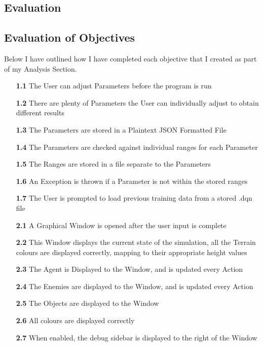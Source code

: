 \begin{flushleft}
    \section{Evaluation}
    \large
    \subsection{Evaluation of Objectives} 
        Below I have outlined how I have completed each objective that I created as part of my Analysis Section.

        \begin{itemize}
            \item[\textbf{1.1}] The User can adjust Parameters before the program is run
            \item[\textbf{1.2}] There are plenty of Parameters the User can individually adjust to obtain different results
            \item[\textbf{1.3}] The Parameters are stored in a Plaintext JSON Formatted File
            \item[\textbf{1.4}] The Parameters are checked against individual ranges for each Parameter
            \item[\textbf{1.5}] The Ranges are stored in a file separate to the Parameters
            \item[\textbf{1.6}] An Exception is thrown if a Parameter is not within the stored ranges
            \item[\textbf{1.7}] The User is prompted to load previous training data from a stored .dqn file 
            \item[\textbf{2.1}] A Graphical Window is opened after the user input is complete
            \item[\textbf{2.2}] This Window displays the current state of the simulation, all the Terrain colours are displayed correctly, mapping to their appropriate height values
            \item[\textbf{2.3}] The Agent is Displayed to the Window, and is updated every Action
            \item[\textbf{2.4}] The Enemies are displayed to the Window, and is updated every Action
            \item[\textbf{2.5}] The Objects are displayed to the Window
            \item[\textbf{2.6}] All colours are displayed correctly
            \item[\textbf{2.7}] When enabled, the debug sidebar is displayed to the right of the Window

\end{itemize}
\end{flushleft}
